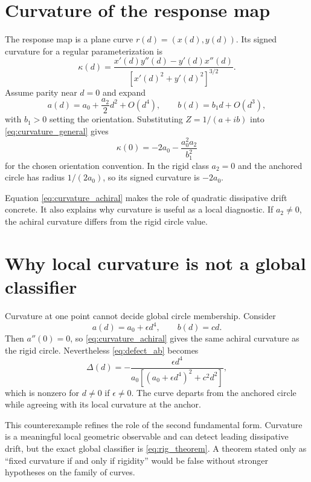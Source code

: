 \section{Curvature of the response map}
The response map is a plane curve $r(d)=(x(d),y(d))$. Its signed curvature for a regular parameterization is
\begin{equation}
 \kappa(d)=
 \frac{x'(d)y''(d)-y'(d)x''(d)}
 {\left[x'(d)^2+y'(d)^2\right]^{3/2}}.
 \label{eq:curvature_general}
\end{equation}
Assume parity near $d=0$ and expand
\begin{equation}
 a(d)=a_0+\frac{a_2}{2}d^2+O(d^4),
 \qquad
 b(d)=b_1d+O(d^3),
 \label{eq:local_expansion}
\end{equation}
with $b_1>0$ setting the orientation. Substituting $Z=1/(a+ib)$ into \cref{eq:curvature_general} gives
\begin{equation}
 \boxed{
 \kappa(0)=-2a_0-\frac{a_0^2a_2}{b_1^2}}
 \label{eq:curvature_achiral}
\end{equation}
for the chosen orientation convention. In the rigid class $a_2=0$ and the anchored circle has radius $1/(2a_0)$, so its signed curvature is $-2a_0$.

Equation \cref{eq:curvature_achiral} makes the role of quadratic dissipative drift concrete. It also explains why curvature is useful as a local diagnostic. If $a_2\ne0$, the achiral curvature differs from the rigid circle value.

\section{Why local curvature is not a global classifier}
Curvature at one point cannot decide global circle membership. Consider
\begin{equation}
 a(d)=a_0+\epsilon d^4,
 \qquad
 b(d)=cd.
 \label{eq:quartic_drift}
\end{equation}
Then $a''(0)=0$, so \cref{eq:curvature_achiral} gives the same achiral curvature as the rigid circle. Nevertheless \cref{eq:defect_ab} becomes
\begin{equation}
 \Delta(d)=
 -\frac{\epsilon d^4}
 {a_0\left[(a_0+\epsilon d^4)^2+c^2d^2\right]},
 \label{eq:quartic_defect}
\end{equation}
which is nonzero for $d\ne0$ if $\epsilon\ne0$. The curve departs from the anchored circle while agreeing with its local curvature at the anchor.

This counterexample refines the role of the second fundamental form. Curvature is a meaningful local geometric observable and can detect leading dissipative drift, but the exact global classifier is \cref{eq:rig_theorem}. A theorem stated only as ``fixed curvature if and only if rigidity'' would be false without stronger hypotheses on the family of curves.


